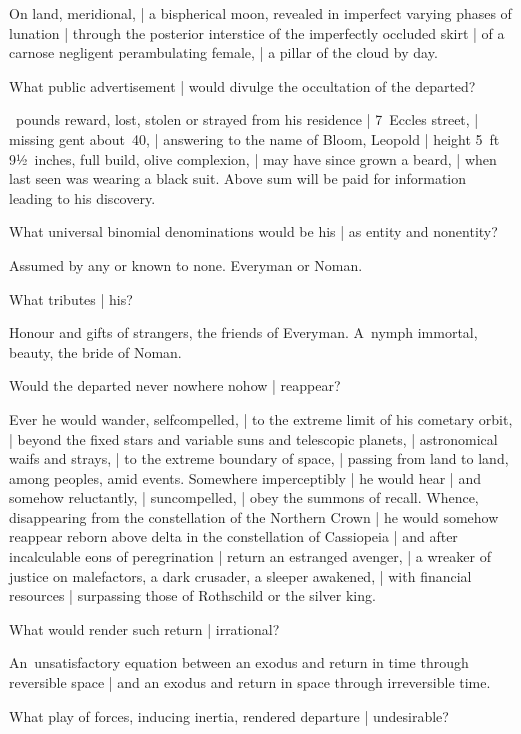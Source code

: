 \Poetry
On land, meridional, |
a bispherical moon, revealed in imperfect varying phases of lunation |
through the posterior interstice
of the imperfectly occluded skirt |
of a carnose negligent perambulating female, |
a pillar of the cloud by day.


What public advertisement |
would divulge the occultation of the departed?

~pounds reward, lost, stolen or strayed from his residence |
7~Eccles street, |
missing gent about~40, |
answering to the name of Bloom, Leopold
 |
height 5~ft 9½~inches, full build, olive complexion, |
may have since grown a beard, |
when last seen was wearing a black suit.
Above sum will be paid for information leading to his discovery.


What universal binomial denominations would be his |
as entity and nonentity?

\Philosophy
Assumed by any or known to none.
Everyman or Noman.


What tributes |
his?

\Poetry
Honour and gifts of strangers, the friends of Everyman.
A~nymph immortal, beauty, the bride of Noman.


Would the departed never nowhere nohow |
reappear?

\Poetry
Ever he would wander, selfcompelled, |
to the extreme limit of his cometary orbit, |
beyond the fixed stars and variable suns and telescopic planets, |
astronomical waifs and strays, |
to the extreme boundary of space, |
passing from land to land, among peoples, amid events.
Somewhere imperceptibly |
he would hear |
and somehow reluctantly, |
suncompelled, |
obey the summons of recall.
Whence,
disappearing from the constellation of the Northern Crown |
he would somehow reappear reborn above delta in the constellation of Cassiopeia |
and after incalculable eons of peregrination |
return an estranged avenger, |
a wreaker of justice on malefactors,
a dark crusader,
a sleeper awakened, |
with financial resources
 |
surpassing those of Rothschild or the silver king.


What would render such return |
irrational?

\Science
An~unsatisfactory equation
between an exodus and return in time through reversible space |
and an exodus and return in space through irreversible time.


What play of forces,
inducing inertia,
rendered departure |
undesirable?

